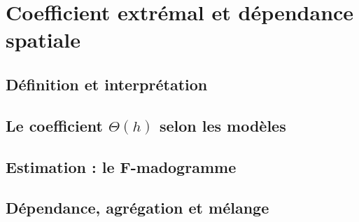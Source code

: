 \section{Coefficient extrémal et dépendance spatiale}
\subsection{Définition et interprétation}
\subsection{Le coefficient $\Theta(h)$ selon les modèles}
\subsection{Estimation : le F-madogramme}
\subsection{Dépendance, agrégation et mélange}
